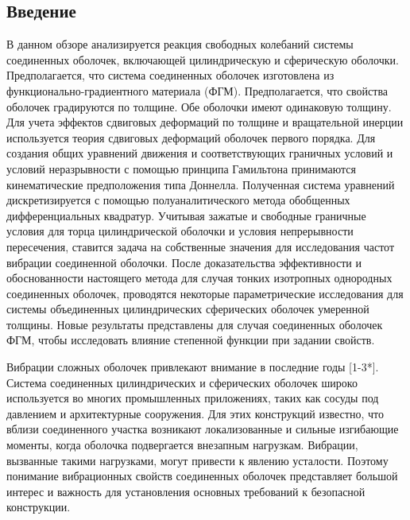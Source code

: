 \subsection{Введение} \label{ch:ch3/sec2/sub1}

В данном обзоре анализируется реакция свободных колебаний системы соединенных оболочек, включающей цилиндрическую и сферическую оболочки. Предполагается, что система соединенных оболочек изготовлена из функционально-градиентного материала (ФГМ). Предполагается, что свойства оболочек градируются по толщине. Обе оболочки имеют одинаковую толщину. Для учета эффектов сдвиговых деформаций по толщине и вращательной инерции используется теория сдвиговых деформаций оболочек первого порядка. Для создания общих уравнений движения и соответствующих граничных условий и условий неразрывности с помощью принципа Гамильтона принимаются кинематические предположения типа Доннелла. Полученная система уравнений дискретизируется с помощью полуаналитического метода обобщенных дифференциальных квадратур. Учитывая зажатые и свободные граничные условия для торца цилиндрической оболочки и условия непрерывности пересечения, ставится задача на собственные значения для исследования частот вибрации соединенной оболочки. После доказательства эффективности и обоснованности настоящего метода для случая тонких изотропных однородных соединенных оболочек, проводятся некоторые параметрические исследования для системы объединенных цилиндрических сферических оболочек умеренной толщины. Новые результаты представлены для случая соединенных оболочек ФГМ, чтобы исследовать влияние степенной функции при задании свойств.


Вибрации сложных оболочек привлекают внимание в последние годы [1-3*]. Система соединенных цилиндрических и сферических оболочек широко используется во многих промышленных приложениях, таких как сосуды под давлением и архитектурные сооружения. Для этих конструкций известно, что вблизи соединенного участка возникают локализованные и сильные изгибающие моменты, когда оболочка подвергается внезапным нагрузкам. Вибрации, вызванные такими нагрузками, могут привести к явлению усталости. Поэтому понимание вибрационных свойств соединенных оболочек представляет большой интерес и важность для установления основных требований к безопасной конструкции.


